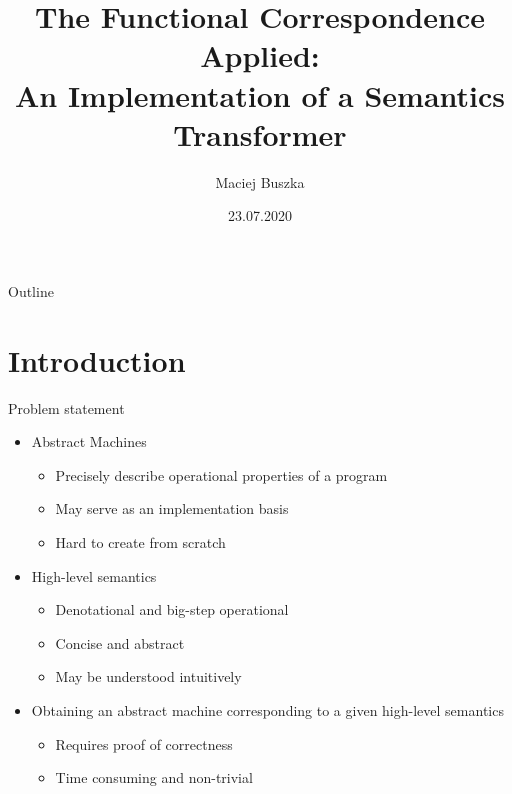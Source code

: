 \documentclass{beamer}
\title[The Functional Correspondence Applied]{The Functional Correspondence Applied:\\ An Implementation of a Semantics Transformer}
\author{Maciej Buszka}
\institute[II UWr]{Instytut Informatyki UWr}
\date{23.07.2020}
\begin{document}
\begin{frame}
  \titlepage
\end{frame}

\begin{frame}{Outline}
  \tableofcontents
\end{frame}

\section{Introduction}
\begin{frame}{Problem statement}
  \begin{itemize}
    \item Abstract Machines
    \pause
    \begin{itemize}
      \item Precisely describe operational properties of a program
      \pause
      \item May serve as an implementation basis
      \pause
      \item Hard to create from scratch
    \end{itemize}
    \item High-level semantics
    \pause
    \begin{itemize}
      \item Denotational and big-step operational
      \pause
      \item Concise and abstract
      \pause
      \item May be understood intuitively
    \end{itemize}
    \item Obtaining an abstract machine corresponding to a given high-level semantics 
    \begin{itemize}
      \pause
      \item Requires proof of correctness
      \pause
      \item Time consuming and non-trivial
    \end{itemize}
  \end{itemize}
\end{frame}
\end{document}
